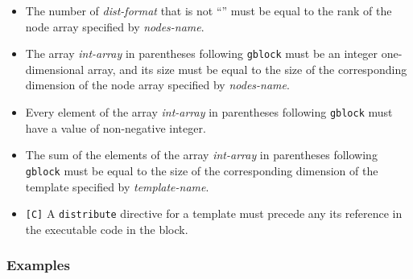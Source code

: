 \begin{itemize}
\item The number of {\it dist-format} that is not ``{\tt *}'' must be
      equal to the rank of the node array specified by {\it nodes-name}.  
\item The array {\it int-array} in parentheses following {\tt gblock}
      must be an integer one-dimensional array, and its size must be
      equal to the size of the corresponding dimension of the node array
      specified by {\it nodes-name}.
\item Every element of the array {\it int-array} in parentheses
      following {\tt gblock} must have a value of non-negative integer.
\item The sum of the elements of the array {\it int-array} in 
      parentheses following {\tt gblock} must be equal to the size of
      the corresponding dimension of the template specified by {\it
      template-name}.
\item \verb![C]! A {\tt distribute} directive for a template must
      precede any its reference in the executable code in the block.
\end{itemize}

\subsubsection*{Examples}

